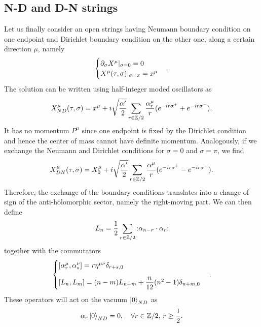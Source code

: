 \subsection{N-D and D-N strings}
Let us finally consider an open strings having Neumann boundary condition on one endpoint and Dirichlet boundary condition on the other one, along a certain direction $\mu$, namely 
\begin{equation}
    \begin{cases}
        \partial_\sigma X^\mu|_{\sigma = 0} = 0 \\
        X^\mu(\tau,\sigma)|_{\sigma = \pi} = x^\mu
    \end{cases}.
\end{equation}
The solution can be written using half-integer moded oscillators as 
\begin{equation}
    X^\mu_{ND}(\tau,\sigma) = x^\mu + i\sqrt{\frac{\alpha'}{2}}\sum_{r \in \mathbb{Z}/2}\frac{\alpha^\mu_r}{r}(e^{-ir\sigma^+} + e^{-ir\sigma^-}).
\end{equation}
It has no momentum $P^\mu$ since one endpoint is fixed by the Dirichlet condition and hence the center of mass cannot have definite momentum. Analogously, if we exchange the Neumann and Dirichlet conditions for $\sigma = 0$ and $\sigma = \pi$, we find 
\begin{equation}
    X_{DN}^\mu(\tau,\sigma) = X_0^\mu + i\sqrt{\frac{\alpha'}{2}}\sum_{r\in\mathbb{Z}/2}\frac{\alpha^\mu}{r}(e^{-ir\sigma^+} - e^{-ir\sigma^-}).
\end{equation}
Therefore, the exchange of the boundary conditions translates into a change of sign of the anti-holomorphic sector, namely the right-moving part. We can then define 
\begin{equation}
    L_n = \frac{1}{2}\sum_{r\in\mathbb{Z}/2}{:}\alpha_{n - r}\cdot\alpha_r{:}
\end{equation}
together with the commutators 
\begin{equation}
    \begin{cases}
        [\alpha^\mu_r,\alpha^\nu_s] = r\eta^{\mu\nu}\delta_{r + s,0} \\[2ex]
        [L_n,L_m] = (n - m)L_{n + m} + \dfrac{n}{12}(n^2 - 1)\delta_{n + m,0}
    \end{cases}.
\end{equation}
These operators will act on the vacuum $\ket{0}_{ND}$ as 
\begin{equation}
    \alpha_r\ket{0}_{ND} = 0,\quad \forall r \in \mathbb{Z}/2,\, r \ge \frac{1}{2}.
\end{equation}
